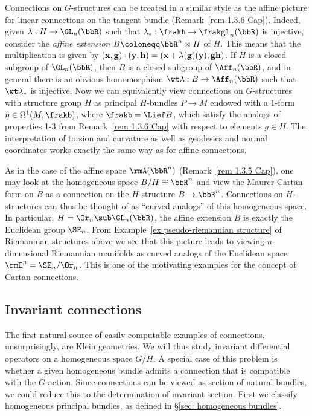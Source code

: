 \begin{example}\label{ex 1.3.6 Cap}
    Connections on $G$-structures can be treated in a similar style as the affine picture for linear connections on the tangent bundle (Remark~\ref{rem 1.3.6 Cap}). Indeed, given $\lambda:H\to \GL_n(\bbR)$ such that $\lambda_\ast:\frakh\to \frakgl_n(\bbR)$ is injective, consider the \emph{affine extension} $B\coloneqq \bbR^n\rtimes H$ of $H$. This means that the multiplication is given by $(\bf{x},g)\cdot (\bf{y},h)=(\bf{x}+\lambda(g)(\bf{y}),gh)$. If $H$ is a closed subgroup of $\GL_n(\bbR)$, then $B$ is a closed subgroup of $\Aff_n(\bbR)$, and in general there is an obvious homomorphism $\wt\lambda:B\to \Aff_n(\bbR)$ such that $\wt\lambda_{\ast}$  is injective. Now we can equivalently view connections on $G$-structures with structure group $H$ as principal $H$-bundles $P\to M$ endowed with a $1$-form $\eta\in\Omega^1(M,\frakb)$, where $\frakb=\Lief B$, which satisfy the analogs of properties 1-3 from Remark~\ref{rem 1.3.6 Cap} with respect to elements $g\in H$. The interpretation of torsion and curvature as well as geodesics and normal coordinates works exactly the same way as for affine connections.

    As in the case of the affine space $\rmA(\bbR^n)$ (Remark~\ref{rem 1.3.5 Cap}), one may look at the homogeneous space $B\slash H\cong\bbR^n$ and view the Maurer-Cartan form on $B$ as a connection on the $H$-structure $B\to\bbR^n$.  Connections on $H$-structures can thus be thought of as ``curved analogs'' of this homogeneous space. In particular, $H=\Or_n\sub \GL_n(\bbR)$, the affine extension $B$ is exactly the Euclidean group $\SE_n$. From Example~\ref{ex pseudo-riemannian structure} of Riemannian structures above we see that this picture leads to viewing $n$-dimensional Riemannian manifolds as curved analogs of the Euclidean space $\rmE^n=\SE_n\slash\Or_n$. This is one of the motivating examples for the concept of Cartan connections.
\end{example}







\subsection{Invariant connections}\label{sec: invariant connections}

The first natural source of easily computable examples of connections, unsurprisingly, are Klein geometries. We will thus study invariant differential operators on a homogeneous space $G\slash H$. A special case of this problem is whether a given homogeneous bundle admits a connection that is compatible with the $G$-action. Since connections can be viewed as section of natural bundles, we could reduce this to the determination of invariant section. First we classify homogeneous principal bundles, as defined in \S\ref{sec: homogeneous bundles}.

